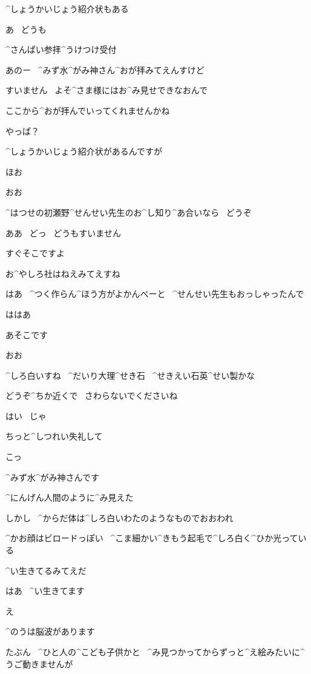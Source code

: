 \Ayase ^{しょうかいじょう}{紹介状}もある

\page
\Ayase あ
\ どうも

\Sign ^{さんぱい}{参拝}^{うけつけ}{受付}

\Ayase あのー
\ ^{みず}{水}^{がみ}{神}さん^{おが}{拝}みてえんすけど

\page
\Person すいません
\ よそ^{さま}{様}にはお^{み}{見}せできなおんで

\Person ここから^{おが}{拝}んでいってくれませんかね

\Ayase やっぱ？

\Ayase ^{しょうかいじょう}{紹介状}があるんですが

\Person ほお

\Person おお

\Person ^{はつせの}{初瀬野}^{せんせい}{先生}のお^{し}{知}り^{あ}{合}いなら
\ どうぞ

\Ayase ああ
\ どっ
\ どうもすいません

\page
\Person すぐそこですよ

\Ayase お^{やしろ}{社}はねえみてえすね

\Person はあ
\ ^{つく}{作}らん^{ほう}{方}がよかんべーと
\ ^{せんせい}{先生}もおっしゃったんで

\Ayase ははあ

\page
\Person あそこです

\Ayase おお

\Ayase ^{しろ}{白}いすね
\ ^{だいり}{大理}^{せき}{石}
\ ^{せきえい}{石英}^{せい}{製}かな

\Person どうぞ^{ちか}{近}くで
\ さわらないでくださいね

\Ayase はい
\ じゃ

\Ayase ちっと^{しつれい}{失礼}して

\page[93]
\Ayase こっ

\Person ^{みず}{水}^{がみ}{神}さんです

\page
\Ayase ^{にんげん}{人間}のように^{み}{見}えた

\Ayase しかし
\ ^{からだ}{体}は^{しろ}{白}いわたのようなものでおおわれ

\Ayase ^{かお}{顔}はビロードっぽい
\ ^{こま}{細}かい^{きもう}{起毛}で^{しろ}{白}く^{ひか}{光}っている

\Ayase ^{い}{生}きてるみてえだ

\Person はあ
\ ^{い}{生}きてます

\Ayase え

\Person ^{のうは}{脳波}があります

\page
\Person たぶん
\ ^{ひと}{人}の^{こども}{子供}かと
\ ^{み}{見}つかってからずっと^{え}{絵}みたいに^{うご}{動}きませんが

